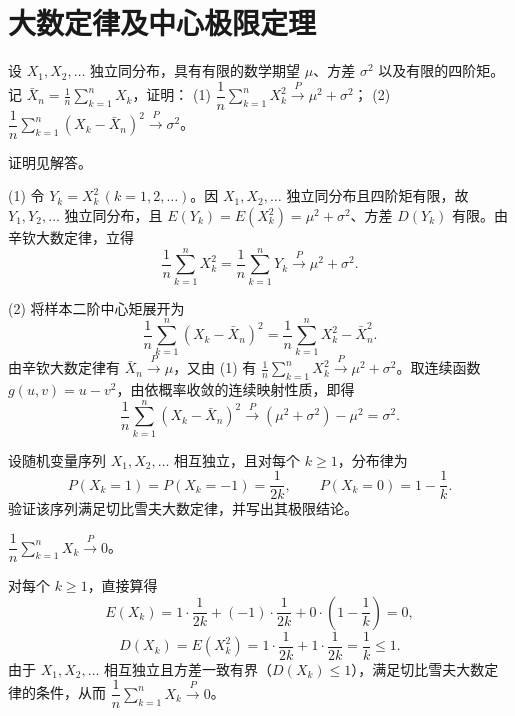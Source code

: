 %
%
\section{大数定律及中心极限定理}

\begin{exercise}
设 $X_1,X_2,\ldots$ 独立同分布，具有有限的数学期望 $\mu$、方差 $\sigma^2$ 以及有限的四阶矩。记 $\bar{X}_n=\frac{1}{n}\sum_{k=1}^{n}X_k$，证明：
(1) $\dfrac{1}{n}\sum_{k=1}^{n}X_k^2\xrightarrow{P}\mu^2+\sigma^2$；
(2) $\dfrac{1}{n}\sum_{k=1}^{n}(X_k-\bar{X}_n)^2\xrightarrow{P}\sigma^2$。
\begin{answer}
证明见解答。
\end{answer}
\begin{solution}
(1) 令 $Y_k=X_k^2\,(k=1,2,\ldots)$。因 $X_1,X_2,\ldots$ 独立同分布且四阶矩有限，故 $Y_1,Y_2,\ldots$ 独立同分布，且 $E(Y_k)=E(X_k^2)=\mu^2+\sigma^2$、方差 $D(Y_k)$ 有限。由辛钦大数定律，立得
\[
  \frac{1}{n}\sum_{k=1}^{n}X_k^2=\frac{1}{n}\sum_{k=1}^{n}Y_k\xrightarrow{P}\mu^2+\sigma^2.
\]

(2) 将样本二阶中心矩展开为
\[
  \frac{1}{n}\sum_{k=1}^{n}(X_k-\bar{X}_n)^2
  =\frac{1}{n}\sum_{k=1}^{n}X_k^2-\bar{X}_n^2.
\]
由辛钦大数定律有 $\bar{X}_n\xrightarrow{P}\mu$，又由 (1) 有 $\frac{1}{n}\sum_{k=1}^{n}X_k^2\xrightarrow{P}\mu^2+\sigma^2$。取连续函数 $g(u,v)=u-v^2$，由依概率收敛的连续映射性质，即得
\[
  \frac{1}{n}\sum_{k=1}^{n}(X_k-\bar{X}_n)^2\xrightarrow{P}(\mu^2+\sigma^2)-\mu^2=\sigma^2.
\]
\end{solution}
\end{exercise}

\begin{exercise}
设随机变量序列 $X_1,X_2,\ldots$ 相互独立，且对每个 $k\ge 1$，分布律为
\[
  P(X_k=1)=P(X_k=-1)=\frac{1}{2k},\qquad P(X_k=0)=1-\frac{1}{k}.
\]
验证该序列满足切比雪夫大数定律，并写出其极限结论。
\begin{answer}
$\dfrac{1}{n}\sum_{k=1}^{n}X_k\xrightarrow{P} 0$。
\end{answer}
\begin{solution}
对每个 $k\ge 1$，直接算得
\[
  E(X_k)=1\cdot\frac{1}{2k}+(-1)\cdot\frac{1}{2k}+0\cdot\left(1-\frac{1}{k}\right)=0,
\]
\[
  D(X_k)=E(X_k^2)=1\cdot\frac{1}{2k}+1\cdot\frac{1}{2k}=\frac{1}{k}\le 1.
\]
由于 $X_1,X_2,\ldots$ 相互独立且方差一致有界（$D(X_k)\le 1$），满足切比雪夫大数定律的条件，从而 $\dfrac{1}{n}\sum_{k=1}^{n}X_k\xrightarrow{P} 0$。
\end{solution}
\end{exercise}

